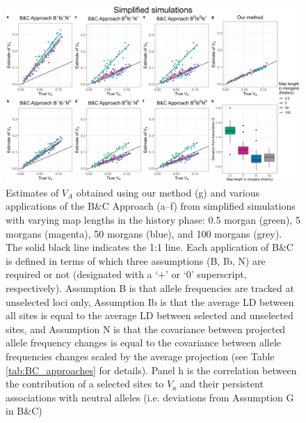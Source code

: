 \documentclass[12pt]{article}
\begin{document}
\begin{bibunit}
\begin{landscape}
\begin{figure}[H]
\begin{center}
\includegraphics[scale = 0.14]{Figures/BC_simplified.jpg}
\end{center}
\caption{Estimates of $V_A$ obtained using our method (g) and various applications of the B\&C Approach (a--f) from simplified simulations with varying 
    map lengths in the history phase: 0.5 morgan (green), 5 morgans (magenta), 50 morgans (blue), and 100 morgans (grey). The solid black line indicates the 1:1 line. Each application of B\&C is defined in terms of which three assumptions (B, Ib, N) are required or not (designated with a `$+$' or `0' superscript, respectively). Assumption B is that allele frequencies are tracked at unselected loci only, Assumption Ib is that the average LD between all sites is equal to the average LD between selected and unselected sites, and Assumption N is that the covariance between projected allele frequency changes is equal to the covariance between allele frequencies changes scaled by the average projection (see Table \ref{tab:BC_approaches} for details). Panel h is the correlation between the contribution of a selected sites to $V_a$ and their persistent associations with neutral alleles (i.e. deviations from Assumption G in B\&C)}
    \label{fig:BC_simplified}
\end{figure}
\end{landscape}


\end{bibunit}
\end{document}

